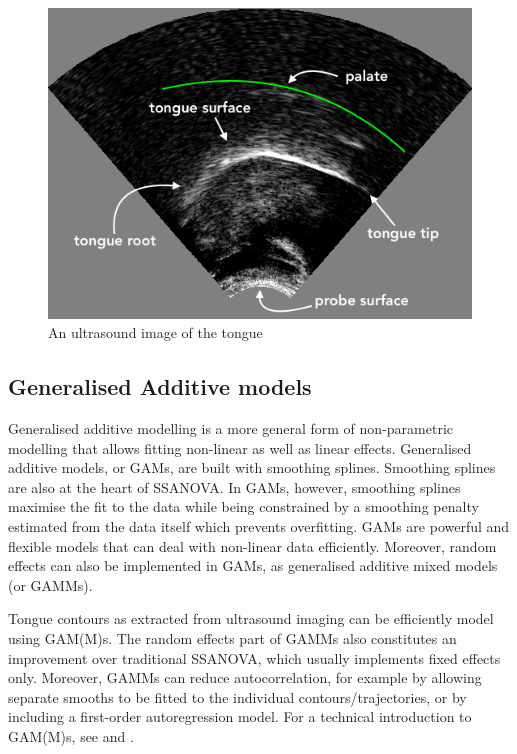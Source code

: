 \documentclass[12pt,]{article}
\begin{document}
\begin{figure}
  \centering
  \includegraphics{./img/uti.png}
  \caption{An ultrasound image of the tongue}
  \label{f:uti}
\end{figure}

\hypertarget{generalised-additive-models}{%
\subsection{Generalised Additive
models}\label{generalised-additive-models}}

Generalised additive modelling is a more general form of non-parametric
modelling that allows fitting non-linear as well as linear effects.
Generalised additive models, or GAMs, are built with smoothing splines.
Smoothing splines are also at the heart of SSANOVA. In GAMs, however,
smoothing splines maximise the fit to the data while being constrained
by a smoothing penalty estimated from the data itself which prevents
overfitting. GAMs are powerful and flexible models that can deal with
non-linear data efficiently. Moreover, random effects can also be
implemented in GAMs, as generalised additive mixed models (or GAMMs).

Tongue contours as extracted from ultrasound imaging can be efficiently
model using GAM(M)s. The random effects part of GAMMs also constitutes
an improvement over traditional SSANOVA, which usually implements fixed
effects only. Moreover, GAMMs can reduce autocorrelation, for example by
allowing separate smooths to be fitted to the individual
contours/trajectories, or by including a first-order autoregression
model. For a technical introduction to GAM(M)s, see \citet{zuur2012} and
\citet{wood2017}.
\end{document}
